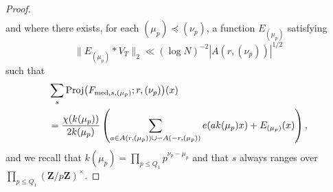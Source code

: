 \documentclass[11pt, reqno]{amsart}
\DeclareMathOperator{\Proj}{Proj}
\begin{document}
\begin{proof}
\begin{align}
    \end{align}
and where there exists, for each $(\mu_p)\preceq(\nu_p)$, a function $E_{(\mu_p)}$ satisfying 
\begin{equation}\label{eq:L^2bound}
\lVert E_{(\mu_p)}*V_{T}\rVert_2\ll (\log N)^{-2}|A(r,(\nu_p))|^{1/2}
\end{equation}
such that
\begin{align}\label{eq:totalmu_pcont}
    &\sum_s\Proj\bigl(F_{\textnormal{med},s,(\mu_p)};r,(\nu_p)\bigr)(x)\\
    &=\frac{\chi(k(\mu_p))}{2k(\mu_p)}\left(\sum_{a\in A(r,(\mu_p))\cup -A(-r,(\mu_p))}e(ak(\mu_p)x) + E_{(\mu_p)}(x)\right),\nonumber
\end{align}
and we recall that $k(\mu_p)=\prod_{p\leqslant Q_1}p^{\nu_p-\mu_p}$ and that $s$ always ranges over $\prod_{p\leqslant Q_1}(\mathbf{Z}/p\mathbf{Z})^\times$.

\medskip


\end{proof}
\end{document}
